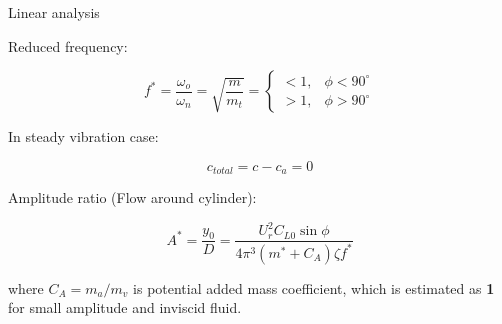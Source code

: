 \documentclass[9pt, xcolor=table]{beamer}
\begin{document}
\begin{frame}{Linear analysis}
	\setlength{\parindent}{2em}

	Reduced frequency:
	
	\begin{equation}
		f^*=\frac{\omega_o}{\omega_{n}}=\sqrt{\frac{m}{m_{t}}}=\begin{cases}
			< 1,& \phi < 90^{\circ} \\
			> 1,& \phi > 90^{\circ}
		\end{cases}
	\end{equation}

	In steady vibration case:

	\begin{equation}
		c_{total} = c-c_a =0
	\end{equation}


	Amplitude ratio (Flow around cylinder):

	\begin{equation}
		A^{*}=\frac{y_{0}}{D}=\frac{U_{r}^{2} C_{L 0} \sin \phi}{4 \pi^{3}\left(m^{*}+C_{A}\right) \zeta f^{*}}
	\end{equation}

	where $C_A = m_a/m_v$ is potential added mass coefficient, which is estimated as \textbf{1} for small amplitude and inviscid fluid.

	
\end{frame}
%
\end{document}
